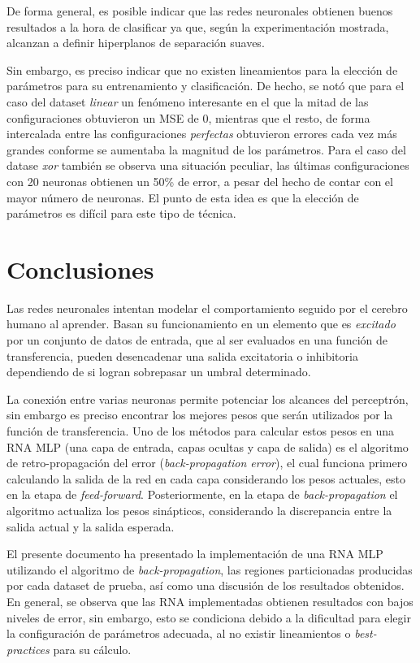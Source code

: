 \documentclass[journal]{IEEEtran}
\begin{document}
De forma general, es posible indicar que las redes neuronales obtienen buenos resultados a la hora de clasificar ya que, según la experimentación mostrada, alcanzan a definir hiperplanos de separación suaves.

Sin embargo, es preciso indicar que no existen lineamientos para la elección de parámetros para su entrenamiento y clasificación.
De hecho, se notó que para el caso del dataset \emph{linear} un fenómeno interesante en el que la mitad de las configuraciones obtuvieron un MSE de $0$, mientras que el resto, de forma intercalada entre las configuraciones \emph{perfectas} obtuvieron errores cada vez más grandes conforme se aumentaba la magnitud de los parámetros.
Para el caso del datase \emph{xor} también se observa una situación peculiar, las últimas configuraciones con 20 neuronas obtienen un 50\% de error, a pesar del hecho de contar con el mayor número de neuronas.
El punto de esta idea es que la elección de parámetros es difícil para este tipo de técnica.


\section{Conclusiones}
\label{sec:conclusiones}
Las redes neuronales intentan modelar el comportamiento seguido por el cerebro humano al aprender.
Basan su funcionamiento en un elemento que es \emph{excitado} por un conjunto de datos de entrada, que al ser evaluados en una función de transferencia, pueden desencadenar una salida excitatoria o inhibitoria dependiendo de si logran sobrepasar un umbral determinado.

La conexión entre varias neuronas permite potenciar los alcances del perceptrón, sin embargo es preciso encontrar los mejores pesos que serán utilizados por la función de transferencia.
Uno de los métodos para calcular estos pesos en una RNA MLP (una capa de entrada, capas ocultas y capa de salida) es el algoritmo de retro-propagación del error (\emph{back-propagation error}), el cual funciona primero calculando la salida de la red en cada capa considerando los pesos actuales, esto en la etapa de \emph{feed-forward}.
Posteriormente, en la etapa de \emph{back-propagation} el algoritmo actualiza los pesos sinápticos, considerando la discrepancia entre la salida actual y la salida esperada.

El presente documento ha presentado la implementación de una RNA MLP utilizando el algoritmo de \emph{back-propagation}, las regiones particionadas producidas por cada dataset de prueba, así como una discusión de los resultados obtenidos.
En general, se observa que las RNA implementadas obtienen resultados con bajos niveles de error, sin embargo, esto se condiciona debido a la dificultad para elegir la configuración de parámetros adecuada, al no existir lineamientos o \emph{best-practices} para su cálculo.

\nocite{*}


\end{document}
